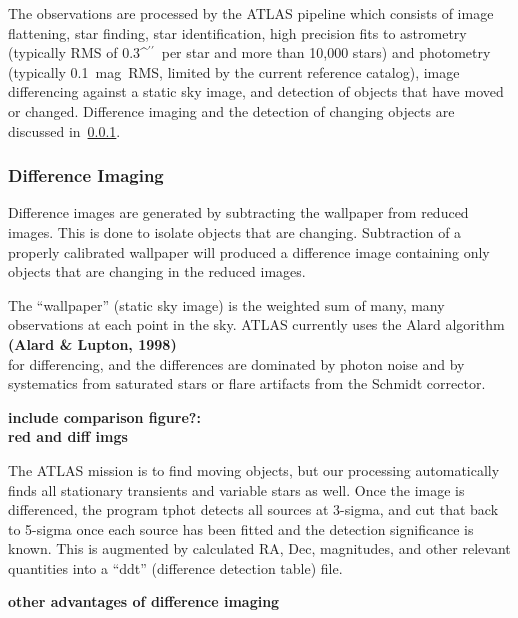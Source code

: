 \documentclass[aps,prb,twocolumn,superscriptaddress]{revtex4-1}
\def\arcsec{\ifmmode^{\prime\prime}\else$^{\prime\prime}$\fi}
\begin{document}
The observations are processed by the ATLAS pipeline which consists of
image flattening, star finding, star identification, high precision
fits to astrometry (typically RMS of 0.3\arcsec\ per star and more
than 10,000 stars) and photometry (typically 0.1~mag~RMS, limited by
the current reference catalog), image differencing against a static sky
image, and detection of objects that have moved or changed.  
Difference imaging and the detection of changing objects 
are discussed in~\cref{sec:diffimg}.


\subsubsection{Difference Imaging}\label{sec:diffimg}

Difference images are generated by subtracting the wallpaper from reduced 
images. This is done to isolate objects that are changing. Subtraction 
of a properly calibrated wallpaper will produced a difference image 
containing only objects that are changing in the reduced images.  

The ``wallpaper'' (static sky image) is the weighted sum of many, many
observations at each point in the sky.  ATLAS currently uses the
Alard algorithm~\cite{Alard_algorithm}\\ 
{\bf (Alard \& Lupton, 1998)} \\ 
for differencing, and the
differences are dominated by photon noise and by systematics from
saturated stars or flare artifacts from the Schmidt corrector.

{\bf\noindent include comparison figure?:\\ \indent red and diff imgs}

The ATLAS mission is to find moving objects, but our processing
automatically finds all stationary transients and variable stars as
well.  Once the image is differenced, the program tphot detects all
sources at 3-sigma, and cut that back to 5-sigma once each source
has been fitted and the detection significance is known.  
This is augmented by calculated RA, Dec, magnitudes, and other relevant
quantities into a ``ddt'' (difference detection table) file.


{\bf other advantages of difference imaging\\}
\end{document}
